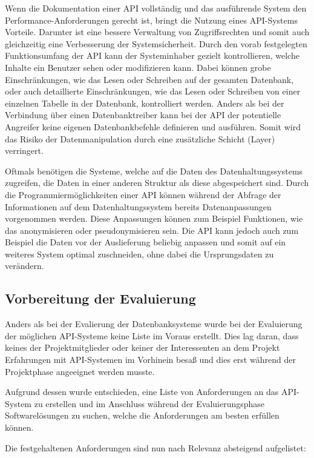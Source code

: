Wenn die Dokumentation einer \gls{API} vollständig und das ausführende System
den Performance\hyp{}Anforderungen gerecht ist, bringt die Nutzung eines
\gls{API}\hyp{}Systems Vorteile. Darunter ist eine bessere Verwaltung von
Zugriffsrechten und somit auch gleichzeitig eine Verbesserung der
Systemsicherheit. Durch den vorab festgelegten Funktionsumfang der \gls{API}
kann der Systeminhaber gezielt kontrollieren, welche Inhalte ein Benutzer sehen
oder modifizieren kann. Dabei können grobe Einschränkungen, wie das Lesen oder
Schreiben auf der gesamten Datenbank, oder auch detaillierte Einschränkungen,
wie das Lesen oder Schreiben von einer einzelnen Tabelle in der Datenbank,
kontrolliert werden. Anders als bei der Verbindung über einen
\gls{Datenbanktreiber} kann bei der \gls{API} der potentielle Angreifer keine
eigenen Datenbankbefehle definieren und ausführen. Somit wird das Risiko der
Datenmanipulation durch eine zusätzliche Schicht (Layer) verringert.

Oftmals benötigen die Systeme, welche auf die Daten des Datenhaltungssystems
zugreifen, die Daten in einer anderen Struktur als diese abgespeichert sind.
Durch die Programmiermöglichkeiten einer \gls{API} können während der Abfrage
der Informationen auf dem Datenhaltungssystem bereits Datenanpassungen
vorgenommen werden. Diese Anpassungen können zum Beispiel Funktionen, wie das
anonymisieren oder pseudonymisieren sein. Die \gls{API} kann jedoch auch zum
Beispiel die Daten vor der Auslieferung beliebig anpassen und somit auf ein
weiteres System optimal zuschneiden, ohne dabei die Ursprungsdaten zu
verändern.
\nl%

\subsection{Vorbereitung der Evaluierung}
\label{subsec:api_vorbereitung_der_evaluierung}
Anders als bei der Evalierung der Datenbanksysteme wurde bei der Evaluierung
der möglichen \gls{API}\hyp{}Systeme keine Liste im Voraus erstellt. Dies lag
daran, dass keines der Projektmitglieder oder keiner der Interessenten an dem
Projekt Erfahrungen mit \gls{API}\hyp{}Systemen im Vorhinein besaß und dies
erst während der Projektphase angeeignet werden musste.

Aufgrund dessen wurde entschieden, eine Liste von Anforderungen an das
\gls{API}\hyp{}System zu erstellen und im Anschluss während der
Evaluierungsphase Softwarelösungen zu suchen, welche die Anforderungen am
besten erfüllen können.

Die festgehaltenen Anforderungen sind nun nach Relevanz absteigend aufgelistet:

